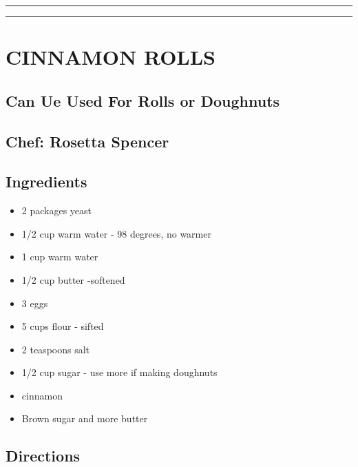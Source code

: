 \documentclass[
]{book}
\providecommand{\tightlist}{%
  \setlength{\itemsep}{0pt}\setlength{\parskip}{0pt}}
\begin{document}
\begin{center}\rule{0.5\linewidth}{0.5pt}\end{center}

\begin{center}\rule{0.5\linewidth}{0.5pt}\end{center}

\hypertarget{cinnamon-rolls}{%
\section*{CINNAMON ROLLS}\label{cinnamon-rolls}}


\hypertarget{can-ue-used-for-rolls-or-doughnuts}{%
\subsection*{Can Ue Used For Rolls or Doughnuts}\label{can-ue-used-for-rolls-or-doughnuts}}


\hypertarget{chef-rosetta-spencer}{%
\subsection*{Chef: Rosetta Spencer}\label{chef-rosetta-spencer}}


\hypertarget{ingredients-75}{%
\subsection*{Ingredients}\label{ingredients-75}}


\begin{itemize}
\tightlist
\item
  2 packages yeast
\item
  1/2 cup warm water - 98 degrees, no warmer
\item
  1 cup warm water
\item
  1/2 cup butter -softened
\item
  3 eggs
\item
  5 cups flour - sifted
\item
  2 teaspoons salt
\item
  1/2 cup sugar - use more if making doughnuts
\item
  cinnamon
\item
  Brown sugar and more butter
\end{itemize}

\hypertarget{directions-75}{%
\subsection*{Directions}\label{directions-75}}
\end{document}

